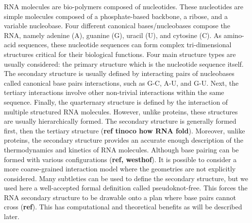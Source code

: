 \documentclass[a4paper,12pt]{article}
\begin{document}
RNA molecules are bio-polymers composed of nucleotides. These nucleotides are
simple molecules composed of a phosphate-based backbone, a ribose, and a
variable nucleobase. Four different canonical bases/nucleobases compose the RNA,
namely adenine (A), guanine (G), uracil (U), and cytosine (C). As amino-acid
sequences, these nucleotide sequences can form complex tri-dimensional
structures critical for their biological functions. Four main structure types
are usually considered: the primary structure which is the nucleotide sequence
itself. The secondary structure is usually defined by interacting pairs of
nucleobases called canonical base pairs interactions, such as G-C, A-U, and G-U.
Next, the tertiary interactions involve other non-trivial interactions within
the same sequence. Finally, the quarternary structure is defined by the
interaction of multiple structured RNA molecules. However, unlike proteins,
these structures are usually hierarchically formed. The secondary structure is
generally formed first, then the tertiary structure (\textbf{ref tinoco how RNA fold}).
Moreover, unlike proteins, the secondary structure provides an accurate enough
description of the thermodynamics and kinetics of RNA molecules. Although base
pairing can be formed with various configurations (\textbf{ref, westhof}). It is
possible to consider a more coarse-grained interaction model where the
geometries are not explicitly considered. Many subtleties can be used to define
the secondary structure, but we used here a well-accepted formal definition
called pseudoknot-free. This forces the RNA secondary structure to be drawable
onto a plan where base pairs cannot cross (\textbf{ref}). This has computational and
theoretical benefits as will be described later.
\end{document}
